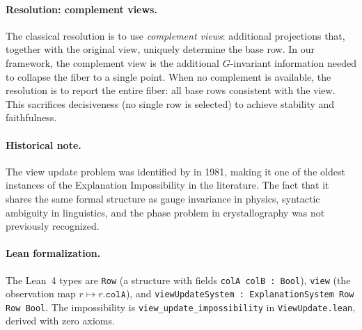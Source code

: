 \paragraph{Resolution: complement views.}
The classical resolution \citep{bancilhon1981update} is to use
\emph{complement views}: additional projections that, together with the
original view, uniquely determine the base row.  In our framework, the
complement view is the additional $G$-invariant information needed to
collapse the fiber to a single point.  When no complement is available, the
resolution is to report the entire fiber: all base rows consistent with the
view.  This sacrifices decisiveness (no single row is selected) to achieve
stability and faithfulness.

\paragraph{Historical note.}
The view update problem was identified by \citet{bancilhon1981update} in 1981,
making it one of the oldest instances of the Explanation Impossibility in the
literature.  The fact that it shares the same formal structure as gauge
invariance in physics, syntactic ambiguity in linguistics, and the phase
problem in crystallography was not previously recognized.

\paragraph{Lean formalization.}
The Lean~4 types are \texttt{Row} (a structure with fields
\texttt{colA colB : Bool}), \texttt{view} (the observation map
$r \mapsto r.\texttt{colA}$), and
\texttt{viewUpdateSystem : ExplanationSystem Row Row Bool}.
The impossibility is \texttt{view\_update\_impossibility} in
\texttt{ViewUpdate.lean}, derived with zero axioms.
